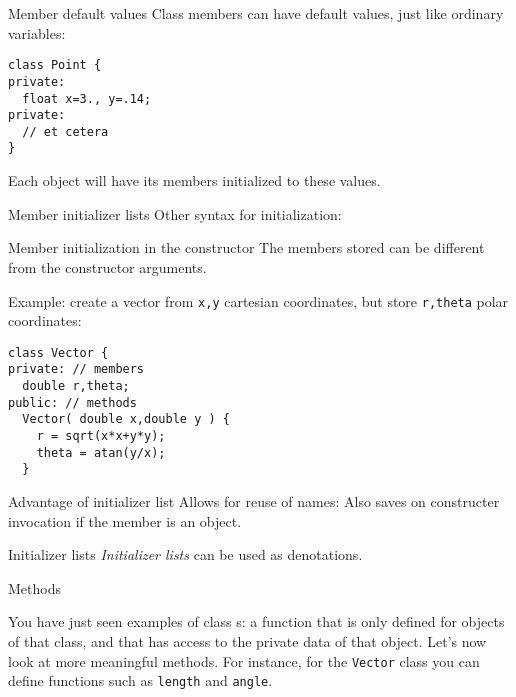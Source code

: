 \begin{block}{Member default values}
  \label{sl:class-defval}
  Class members can have default values, just like ordinary variables:
\begin{lstlisting}
class Point {
private:
  float x=3., y=.14;
private:
  // et cetera
}
\end{lstlisting}
  Each object will have its members initialized to these values.
\end{block}

\begin{block}{Member initializer lists}
  \label{sl:class-init}
  Other syntax for initialization:
\end{block}

\begin{block}{Member initialization in the constructor}
  \label{sl:class-set}
  The members stored can be different from the constructor arguments.

  Example: create a vector from \lstinline{x,y} cartesian coordinates,
  but store \lstinline{r,theta} polar coordinates:

\begin{lstlisting}
class Vector {
private: // members
  double r,theta;
public: // methods
  Vector( double x,double y ) {
    r = sqrt(x*x+y*y);
    theta = atan(y/x);
  }
\end{lstlisting}
\end{block}

\begin{block}{Advantage of initializer list}
  \label{sl:class-init-why}
  Allows for reuse of names:
  Also saves on constructer invocation if the member is an object.
\end{block}

\begin{block}{Initializer lists}
  \label{sl:class-inlist}
  \emph{Initializer lists} can be used as denotations.
\end{block}

 {Methods}

You have just seen examples of class
s: a function that is only defined for objects of
that class, and that has access to the private data of that object.
Let's now look at more meaningful methods. For instance, for the
\lstinline{Vector} class you can define functions such as \lstinline{length} and
\lstinline{angle}. 
%

